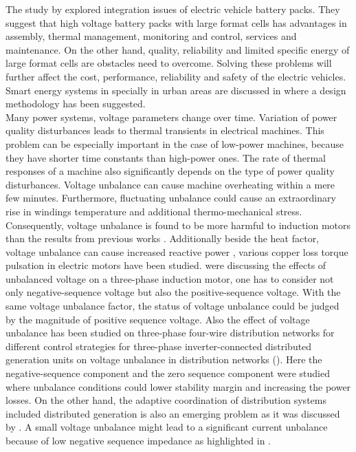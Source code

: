  The study by \cite{huat2015integration} explored integration issues of electric vehicle battery packs. They suggest that high voltage battery packs with large format cells has advantages in assembly, thermal management, monitoring and control, services and maintenance. On the other hand, quality, reliability and limited specific energy of large format cells are obstacles need to overcome. Solving these problems will further affect the cost, performance, reliability and safety of the electric vehicles. Smart energy systems in specially in urban areas are discussed in \cite{lund2015smart} where a design methodology has been suggested.\\

Many power systems, voltage parameters change over time. Variation of power quality disturbances leads to thermal transients in electrical machines. This problem can be especially important in the case of low-power machines, because they have shorter time constants than high-power ones. The rate of thermal responses of a machine also significantly depends on the type of power quality disturbances. Voltage unbalance can cause  machine  overheating  within  a  mere  few  minutes. Furthermore,  fluctuating  unbalance  could  cause  an  extraordinary rise  in  windings  temperature  and  additional  thermo-mechanical stress.  Consequently,  voltage  unbalance  is  found  to  be  more harmful to induction motors than the results from previous works \cite{gnacinski2019induction}. Additionally beside the heat factor, voltage unbalance can cause increased reactive power \cite{savaghebi2012secondary}, various copper loss \cite{siddique2004effects} torque pulsation in electric motors \cite{brekken2005control} have been studied. \cite{lee1998effects} were discussing the effects of unbalanced voltage on a three-phase induction motor, one has to consider not only negative-sequence voltage but also the positive-sequence voltage. With the same voltage unbalance factor, the status of voltage unbalance could be judged by the magnitude of positive sequence voltage. Also the effect of voltage unbalance has been studied on three-phase four-wire distribution networks for different control strategies for three-phase inverter-connected distributed generation units on voltage unbalance in distribution networks (\cite{meersman2011three}). Here the negative-sequence component and the zero sequence component were studied where unbalance conditions could lower stability margin and increasing the power losses. On the other hand, the adaptive coordination of distribution systems included distributed generation is also an emerging problem as it was discussed by \cite{ates2016}.  A small voltage unbalance might lead to a significant current unbalance because of low negative sequence impedance as highlighted in \cite{bina2011three}.\\

